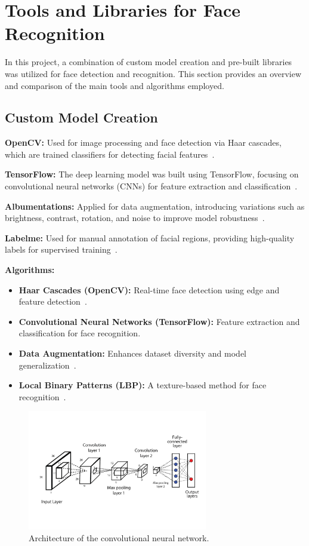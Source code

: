 \section{Tools and Libraries for Face Recognition}

In this project, a combination of custom model creation and pre-built libraries was utilized for face detection and recognition. This section provides an overview and comparison of the main tools and algorithms employed.

\subsection{Custom Model Creation}

\textbf{OpenCV:} Used for image processing and face detection via Haar cascades, which are trained classifiers for detecting facial features~\cite{viola2001rapid}.

\textbf{TensorFlow:} The deep learning model was built using TensorFlow, focusing on convolutional neural networks (CNNs) for feature extraction and classification~\cite{tensorflow}.

\textbf{Albumentations:} Applied for data augmentation, introducing variations such as brightness, contrast, rotation, and noise to improve model robustness~\cite{albumentations}.

\textbf{Labelme:} Used for manual annotation of facial regions, providing high-quality labels for supervised training~\cite{labelme}.

\textbf{Algorithms:}
\begin{itemize}
    \item \textbf{Haar Cascades (OpenCV):} Real-time face detection using edge and feature detection~\cite{viola2001rapid}.
    \item \textbf{Convolutional Neural Networks (TensorFlow):} Feature extraction and classification for face recognition.
    \item \textbf{Data Augmentation:} Enhances dataset diversity and model generalization~\cite{albumentations}.
    \item \textbf{Local Binary Patterns (LBP):} A texture-based method for face recognition~\cite{ahonen2007lbp}.
\end{itemize}

\begin{figure}[ht!]
    \centering
    \includegraphics[width=0.7\textwidth]{../Files/convolutional_network_architecture.png}
    \caption{Architecture of the convolutional neural network.}
    \label{fig:cnn-architecture}
\end{figure}

